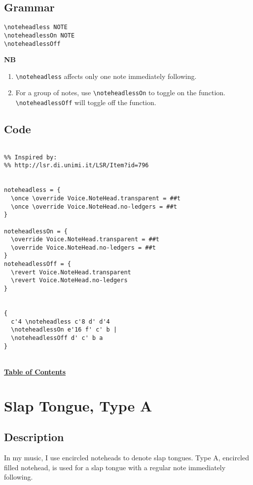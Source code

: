 \documentclass[11pt, oneside]{book}   	%
\begin{document}
\subsection{Grammar}
\begin{verbatim}
\noteheadless NOTE
\noteheadlessOn NOTE 
\noteheadlessOff
\end{verbatim}

\textbf{NB} 
\begin{enumerate} 
\item \verb|\noteheadless| affects only one note immediately following. 
\item For a group of notes, use \verb|\noteheadlessOn| to toggle on the function.  \verb|\noteheadlessOff| will toggle off the function.
\end{enumerate}

\subsection{Code}
\begin{verbatim}

%% Inspired by:
%% http://lsr.di.unimi.it/LSR/Item?id=796


noteheadless = {
  \once \override Voice.NoteHead.transparent = ##t
  \once \override Voice.NoteHead.no-ledgers = ##t
}

noteheadlessOn = {
  \override Voice.NoteHead.transparent = ##t
  \override Voice.NoteHead.no-ledgers = ##t
}
noteheadlessOff = {
  \revert Voice.NoteHead.transparent
  \revert Voice.NoteHead.no-ledgers
}


{
  c'4 \noteheadless c'8 d' d'4
  \noteheadlessOn e'16 f' c' b |
  \noteheadlessOff d' c' b a
}

\end{verbatim}
\hyperref[sec:toc]{\\ \textbf{Table of Contents}}

\vfill \break


\section {Slap Tongue, Type A}
\hfill

\subsection{Description}
	In my music, I use encircled noteheads to denote slap tongues. Type A, encircled filled notehead, is used for a slap tongue with a regular note immediately following. 
	
\end{document}
